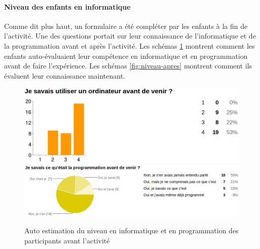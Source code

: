 \paragraph{Niveau des enfants en informatique}
Comme dit plus haut, un formulaire a été compléter par les enfants à la fin de l'activité. Une des questions portait sur leur connaissance de l'informatique et de la programmation avant et après l'activité. Les schémas \ref{fig:niveau-avant} montrent comment les enfants auto-évaluaient leur compétence en informatique et en programmation avant de faire l'expérience. Les schémas \ref{fig:niveau-apres} montrent comment ils évaluent leur connaissance maintenant.
\begin{figure}[]
  \begin{center}
    \includegraphics[width=\textwidth]{content/8-validation/images/avant}
    \includegraphics[width=\textwidth]{content/8-validation/images/programmation}
    \caption{Auto estimation du niveau en informatique et en programmation des participants avant l'activité}
    \label{fig:niveau-avant}
  \end{center}
\end{figure}
